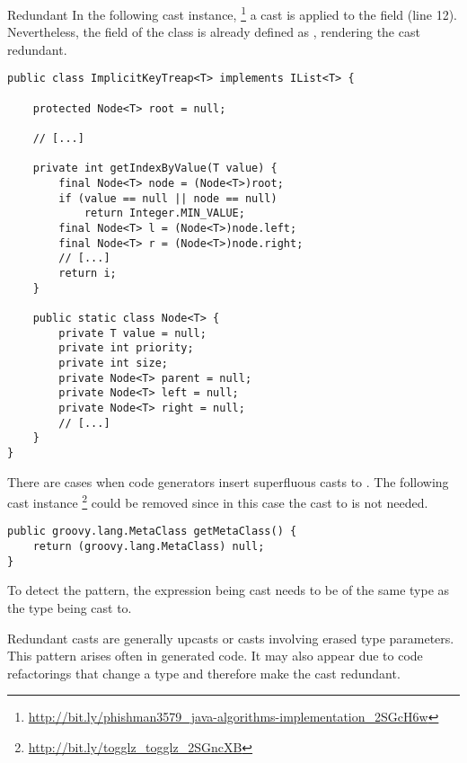 \begin{pattern}{Redundant}
In the following cast instance,%
\footnote{\url{http://bit.ly/phishman3579_java-algorithms-implementation_2SGcH6w}}
a cast is applied to the  field (line 12).
Nevertheless, the  field of the  class is already defined as ,
rendering the cast redundant.

\begin{verbatim}
public class ImplicitKeyTreap<T> implements IList<T> {

    protected Node<T> root = null;

    // [...]

    private int getIndexByValue(T value) {
        final Node<T> node = (Node<T>)root;
        if (value == null || node == null)
            return Integer.MIN_VALUE;
        final Node<T> l = (Node<T>)node.left;
        final Node<T> r = (Node<T>)node.right;
        // [...]
        return i;
    }

    public static class Node<T> {
        private T value = null;
        private int priority;
        private int size;
        private Node<T> parent = null;
        private Node<T> left = null;
        private Node<T> right = null;
        // [...]
    }
}
\end{verbatim}

There are cases when code generators insert superfluous casts to .
The following cast instance%
\footnote{\url{http://bit.ly/togglz_togglz_2SGncXB}}
could be removed since in this case the cast to  is not needed.

\begin{verbatim}
public groovy.lang.MetaClass getMetaClass() {
    return (groovy.lang.MetaClass) null;
}
\end{verbatim}

\detection{}
%
To detect the \thisp{} pattern, 
the expression being cast needs to be of the same type as the type being cast to.

\discussion{}
Redundant casts are generally upcasts or casts involving erased type parameters.
  This pattern arises often in generated code.
  It may also appear 
due to code refactorings that change a type and therefore make the cast
  redundant.

    
\end{pattern}
